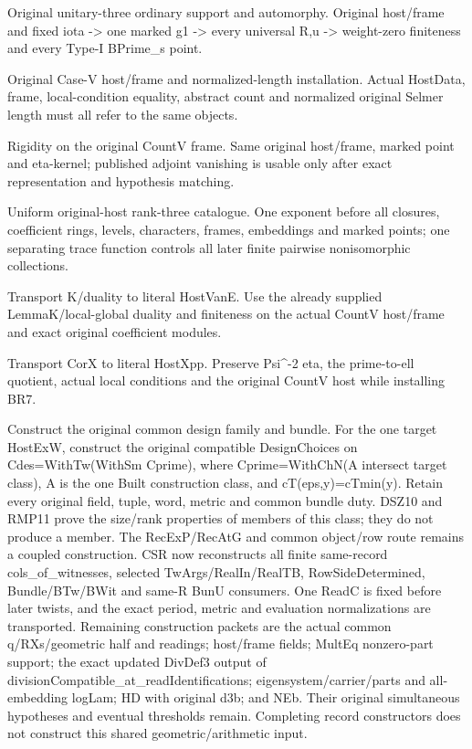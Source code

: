 \begin{description}[style=nextline]
\item[22. THM\_S6\_S --- C] Original unitary-three ordinary support and automorphy. Original host/frame and fixed iota -> one marked g1 -> every universal R,u -> weight-zero finiteness and every Type-I BPrime\_s point.

\item[23. HOST\_FRAME\_LENGTH --- B] Original Case-V host/frame and normalized-length installation. Actual HostData, frame, local-condition equality, abstract count and normalized original Selmer length must all refer to the same objects.

\item[24. HOST\_RIGID\_S --- D] Rigidity on the original CountV frame. Same original host/frame, marked point and eta-kernel; published adjoint vanishing is usable only after exact representation and hypothesis matching.

\item[25. HOST\_NUMBER\_S --- C] Uniform original-host rank-three catalogue. One exponent before all closures, coefficient rings, levels, characters, frames, embeddings and marked points; one separating trace function controls all later finite pairwise nonisomorphic collections.

\item[26. TASK\_HOST\_VAN\_E\_INSTALL --- B] Transport K/duality to literal HostVanE. Use the already supplied LemmaK/local-global duality and finiteness on the actual CountV host/frame and exact original coefficient modules.

\item[27. TASK\_HOST\_XPP\_INSTALL --- B] Transport CorX to literal HostXpp. Preserve Psi\textasciicircum{}-2 eta, the prime-to-ell quotient, actual local conditions and the original CountV host while installing BR7.

\item[28. DESIGN\_CHOICES\_COMMON --- C] Construct the original common design family and bundle. For the one target HostExW, construct the original compatible DesignChoices on Cdes=WithTw(WithSm Cprime), where Cprime=WithChN(A intersect target class), A is the one Built construction class, and cT(eps,y)=cTmin(y). Retain every original field, tuple, word, metric and common bundle duty. DSZ10 and RMP11 prove the size/rank properties of members of this class; they do not produce a member. The RecExP/RecAtG and common object/row route remains a coupled construction. CSR now reconstructs all finite same-record cols\_of\_witnesses, selected TwArgs/RealIn/RealTB, RowSideDetermined, Bundle/BTw/BWit and same-R BunU consumers. One ReadC is fixed before later twists, and the exact period, metric and evaluation normalizations are transported. Remaining construction packets are the actual common q/RXs/geometric half and readings; host/frame fields; MultEq nonzero-part support; the exact updated DivDef3 output of divisionCompatible\_at\_readIdentifications; eigensystem/carrier/parts and all-embedding logLam; HD with original d3b; and NEb. Their original simultaneous hypotheses and eventual thresholds remain. Completing record constructors does not construct this shared geometric/arithmetic input.


\end{description}
